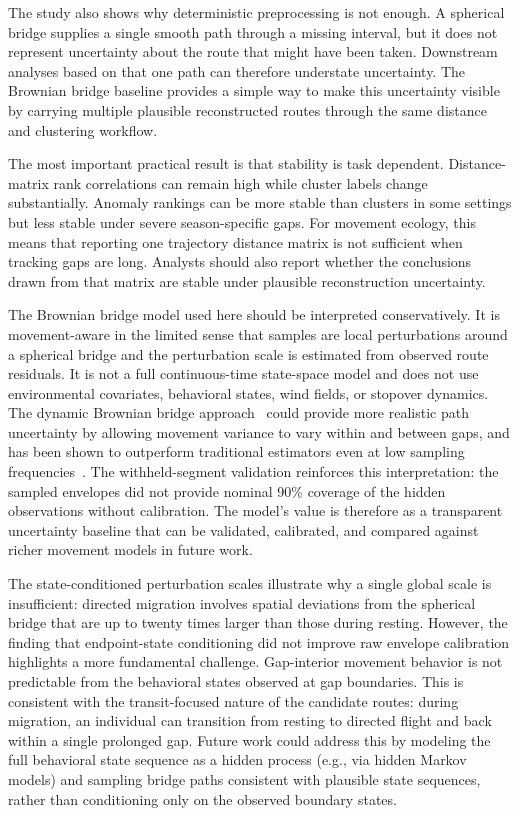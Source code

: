 \documentclass[pdflatex,sn-vancouver-num]{sn-jnl}
\begin{document}
The study also shows why deterministic preprocessing is not enough. A spherical bridge supplies a single smooth path through a missing interval, but it does not represent uncertainty about the route that might have been taken. Downstream analyses based on that one path can therefore understate uncertainty. The Brownian bridge baseline provides a simple way to make this uncertainty visible by carrying multiple plausible reconstructed routes through the same distance and clustering workflow.

The most important practical result is that stability is task dependent. Distance-matrix rank correlations can remain high while cluster labels change substantially. Anomaly rankings can be more stable than clusters in some settings but less stable under severe season-specific gaps. For movement ecology, this means that reporting one trajectory distance matrix is not sufficient when tracking gaps are long. Analysts should also report whether the conclusions drawn from that matrix are stable under plausible reconstruction uncertainty.

The Brownian bridge model used here should be interpreted conservatively. It is movement-aware in the limited sense that samples are local perturbations around a spherical bridge and the perturbation scale is estimated from observed route residuals. It is not a full continuous-time state-space model and does not use environmental covariates, behavioral states, wind fields, or stopover dynamics. The dynamic Brownian bridge approach~\cite{kranstauber2012} could provide more realistic path uncertainty by allowing movement variance to vary within and between gaps, and has been shown to outperform traditional estimators even at low sampling frequencies~\cite{silva2020}. The withheld-segment validation reinforces this interpretation: the sampled envelopes did not provide nominal 90\% coverage of the hidden observations without calibration. The model's value is therefore as a transparent uncertainty baseline that can be validated, calibrated, and compared against richer movement models in future work.

The state-conditioned perturbation scales illustrate why a single global scale is insufficient: directed migration involves spatial deviations from the spherical bridge that are up to twenty times larger than those during resting. However, the finding that endpoint-state conditioning did not improve raw envelope calibration highlights a more fundamental challenge. Gap-interior movement behavior is not predictable from the behavioral states observed at gap boundaries. This is consistent with the transit-focused nature of the candidate routes: during migration, an individual can transition from resting to directed flight and back within a single prolonged gap. Future work could address this by modeling the full behavioral state sequence as a hidden process (e.g., via hidden Markov models) and sampling bridge paths consistent with plausible state sequences, rather than conditioning only on the observed boundary states.
\end{document}
